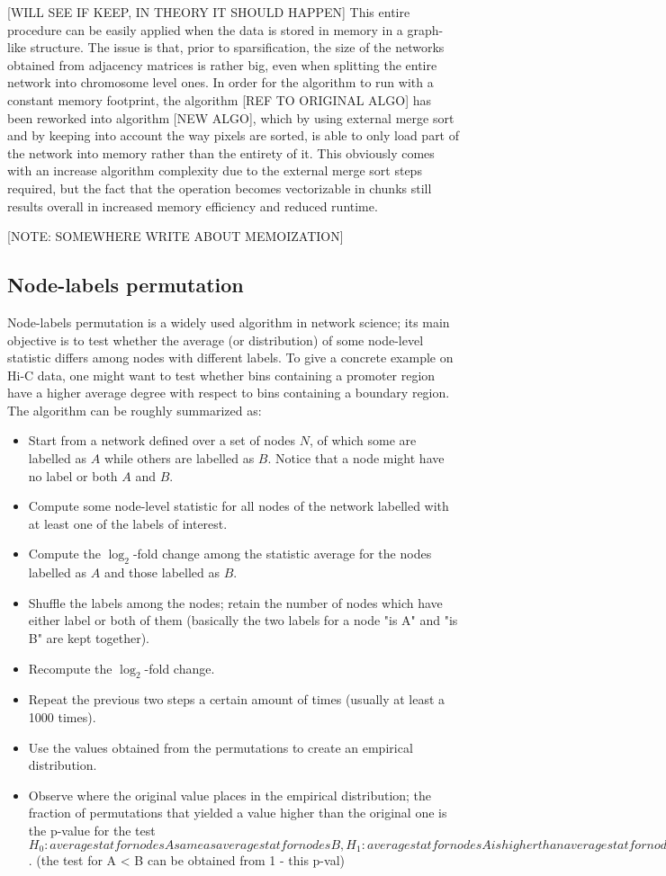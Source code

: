 [WILL SEE IF KEEP, IN THEORY IT SHOULD HAPPEN]
This entire procedure can be easily applied when the data is stored in memory in a graph-like structure. The issue is that, prior to sparsification, the size of the networks obtained from adjacency matrices is rather big, even when splitting the entire network into chromosome level ones. In order for the algorithm to run with a constant memory footprint, the algorithm [REF TO ORIGINAL ALGO] has been reworked into algorithm [NEW ALGO], which by using external merge sort and by keeping into account the way pixels are sorted, is able to only load part of the network into memory rather than the entirety of it. This obviously comes with an increase algorithm complexity due to the external merge sort steps required, but the fact that the operation becomes vectorizable in chunks still results overall in increased memory efficiency and reduced runtime.

[NOTE: SOMEWHERE WRITE ABOUT MEMOIZATION]

\subsection{Node-labels permutation}
Node-labels permutation is a widely used algorithm in network science; its main objective is to test whether the average (or distribution) of some node-level statistic differs among nodes with different labels. To give a concrete example on Hi-C data, one might want to test whether bins containing a promoter region have a higher average degree with respect to bins containing a boundary region. 
The algorithm can be roughly summarized as:
\begin{itemize}\tightlist
  \item Start from a network defined over a set of nodes $N$, of which some are labelled as $A$ while others are labelled as $B$. Notice that a node might have no label or both $A$ and $B$.
  \item Compute some node-level statistic for all nodes of the network labelled with at least one of the labels of interest.
  \item Compute the $\log_2$-fold change among the statistic average for the nodes labelled as $A$ and those labelled as $B$.
  \item Shuffle the labels among the nodes; retain the number of nodes which have either label or both of them (basically the two labels for a node "is A" and "is B" are kept together).
  \item Recompute the $\log_2$-fold change.
  \item Repeat the previous two steps a certain amount of times (usually at least a 1000 times).
  \item Use the values obtained from the permutations to create an empirical distribution.
  \item Observe where the original value places in the empirical distribution; the fraction of permutations that yielded a value higher than the original one is the p-value for the test
  $H_0: average stat for nodes A same as average stat for nodes B, H_1: average stat for nodes A is higher than average stat for nodes B$. (the test for A < B can be obtained from 1 - this p-val)
\end{itemize}


